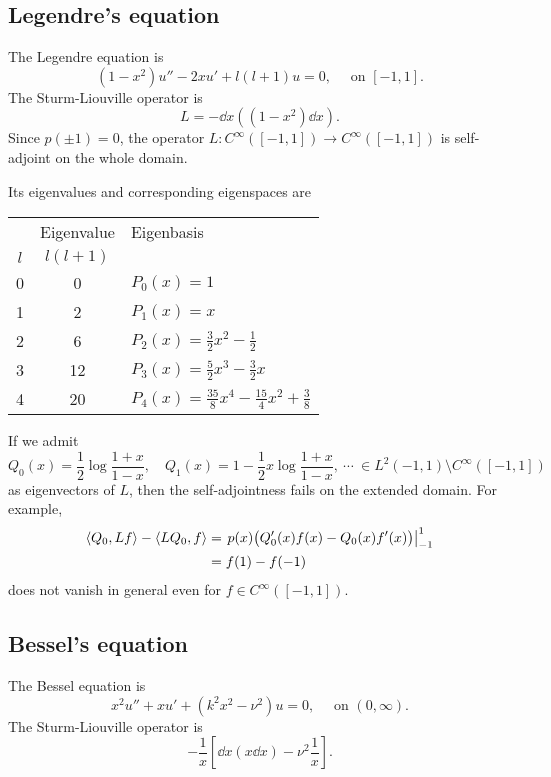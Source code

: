 \documentclass[a4paper]{article}
\begin{document}
\subsection{Legendre's equation}
The Legendre equation is
\[(1-x^2)u''-2xu'+l(l+1)u=0,\quad\text{ on }[-1,1].\]
The Sturm-Liouville operator is
\[L=-\dd{x}\left((1-x^2)\dd{x}\right).\]
Since $p(\pm1)=0$, the operator $L:C^\infty([-1,1])\to C^\infty([-1,1])$ is self-adjoint on the whole domain.


Its eigenvalues and corresponding eigenspaces are
\begin{center}\renewcommand{\arraystretch}{1.2}
\begin{tabular}{c|c|l}
\hline
    & Eigenvalue & Eigenbasis \\
$l$ & $l(l+1)$   & \\
\hline
0   & 0          & $P_0(x)=1$ \\
1   & 2          & $P_1(x)=x$ \\
2   & 6          & $P_2(x)=\frac32x^2-\frac12$ \\
3   & 12         & $P_3(x)=\frac52x^3-\frac32x$ \\
4   & 20         & $P_4(x)=\frac{35}8x^4-\frac{15}4x^2+\frac38$\\
\hline
\end{tabular}
\end{center}
If we admit
\[Q_0(x)=\frac12\log\frac{1+x}{1-x},\quad Q_1(x)=1-\frac12x\log\frac{1+x}{1-x},\ \cdots\ \in L^2(-1,1)\setminus C^\infty([-1,1])\]
as eigenvectors of $L$, then the self-adjointness fails on the extended domain.
For example,
\begin{align*}
\langle Q_0,Lf\rangle-\langle LQ_0,f\rangle
&=\left.p(x)\bigl(Q_0'(x)f(x)-Q_0(x)f'(x)\bigr)\right|_{-1}^1\\
&=f(1)-f(-1)
\end{align*}
does not vanish in general even for $f\in C^\infty([-1,1])$.

\subsection{Bessel's equation}
The Bessel equation is
\[x^2u''+xu'+(k^2x^2-\nu^2)u=0,\quad\text{ on }(0,\infty).\]
The Sturm-Liouville operator is
\[-\frac1x\left[\dd{x}\left(x\dd{x}\right)-\nu^2\frac1x\right].\]
\end{document}
